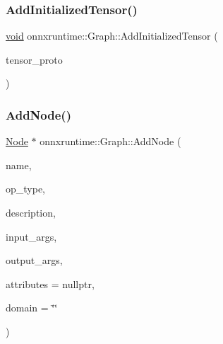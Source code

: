 \mbox{\label{classonnxruntime_1_1Graph_a5699ed675666c1b351bd35490d94be6d}} 
\subsubsection{\texorpdfstring{Add\+Initialized\+Tensor()}{AddInitializedTensor()}}
{\footnotesize\ttfamily \mbox{\hyperlink{mlasi_8h_a88f941d423cb2a819b70a1358982b1a6}{void}} onnxruntime\+::\+Graph\+::\+Add\+Initialized\+Tensor (\begin{DoxyParamCaption}\item[{const O\+N\+N\+X\+\_\+\+N\+A\+M\+E\+S\+P\+A\+C\+E\+::\+Tensor\+Proto \&}]{tensor\+\_\+proto }\end{DoxyParamCaption})}

\mbox{\label{classonnxruntime_1_1Graph_aac8515a9a51b8fc25bff257c4e1c0bb6}} 
\subsubsection{\texorpdfstring{Add\+Node()}{AddNode()}\hspace{0.1cm}{\footnotesize\ttfamily [1/2]}}
{\footnotesize\ttfamily \mbox{\hyperlink{classonnxruntime_1_1Node}{Node}} $\ast$ onnxruntime\+::\+Graph\+::\+Add\+Node (\begin{DoxyParamCaption}\item[{const std\+::string \&}]{name,  }\item[{const std\+::string \&}]{op\+\_\+type,  }\item[{const std\+::string \&}]{description,  }\item[{const std\+::vector$<$ \mbox{\hyperlink{classonnxruntime_1_1NodeArg}{Node\+Arg}} $\ast$$>$ \&}]{input\+\_\+args,  }\item[{const std\+::vector$<$ \mbox{\hyperlink{classonnxruntime_1_1NodeArg}{Node\+Arg}} $\ast$$>$ \&}]{output\+\_\+args,  }\item[{const \mbox{\hyperlink{namespaceonnxruntime_a7fa616c461850e300cfa552afd46eed4}{Node\+Attributes}} $\ast$}]{attributes = {\ttfamily nullptr},  }\item[{const std\+::string \&}]{domain = {\ttfamily \char`\"{}\char`\"{}} }\end{DoxyParamCaption})}

